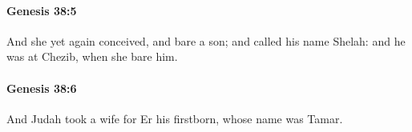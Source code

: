 		\paragraph{Genesis 38:5} %
			\label{GENESIS-38-5}

			And she yet again conceived, and bare a son; and called his name Shelah: and he was at Chezib, when she bare him.


		\paragraph{Genesis 38:6} %
			\label{GENESIS-38-6}

			And Judah took a wife for Er his firstborn, whose name was Tamar.


